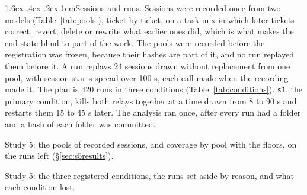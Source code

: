 \documentclass[11pt]{article}
\makeatletter
\renewcommand\paragraph{\@startsection{paragraph}{4}{\z@}%
  {1.6ex \@plus .4ex \@minus .2ex}{-1em}{\normalfont\normalsize\bfseries}}
\makeatother
\begin{document}
\paragraph{Sessions and runs.} Sessions were recorded once from two models
(Table~\ref{tab:pools}), ticket by ticket, on a task mix in which later tickets correct,
revert, delete or rewrite what earlier ones did, which is what makes the end state blind
to part of the work. The pools were recorded before the registration was frozen, because
their hashes are part of it, and no run replayed them before it. A run replays 24
sessions drawn without replacement from one pool, with session starts spread
over 100 s, each call made when the recording made it. The plan is 420 runs in three
conditions (Table~\ref{tab:conditions}). \texttt{s1}, the primary condition, kills both
relays together at a time drawn from 8 to 90 s and restarts them 15 to 45 s later. The
analysis ran once, after every run had a folder and a hash of each folder was committed.

\begin{table}[!tb]
\centering\small

\caption{Study 5: the pools of recorded sessions, and coverage by pool with the floors,
on the runs left (\S\ref{sec:s5results}).}
\label{tab:pools}
\end{table}

\begin{table}[!tb]
\centering\small

\caption{Study 5: the three registered conditions, the runs set aside by reason, and
what each condition lost.}
\label{tab:conditions}
\end{table}
\end{document}
